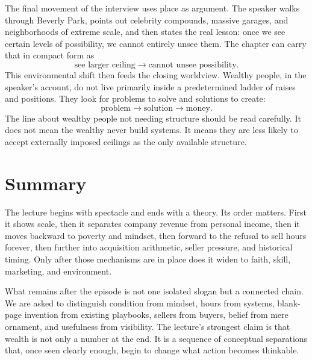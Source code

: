 The final movement of the interview uses place as argument. The speaker walks through Beverly Park, points out celebrity compounds, massive garages, and neighborhoods of extreme scale, and then states the real lesson: once we see certain levels of possibility, we cannot entirely unsee them. The chapter can carry that in compact form as
\begin{equation}
\text{see larger ceiling} \to \text{cannot unsee possibility}.
\end{equation}
This environmental shift then feeds the closing worldview. Wealthy people, in the speaker's account, do not live primarily inside a predetermined ladder of raises and positions. They look for problems to solve and solutions to create:
\begin{equation}
\text{problem} \to \text{solution} \to \text{money}.
\end{equation}
The line about wealthy people not needing structure should be read carefully. It does not mean the wealthy never build systems. It means they are less likely to accept externally imposed ceilings as the only available structure.

\section{Summary}

The lecture begins with spectacle and ends with a theory. Its order matters. First it shows scale, then it separates company revenue from personal income, then it moves backward to poverty and mindset, then forward to the refusal to sell hours forever, then further into acquisition arithmetic, seller pressure, and historical timing. Only after those mechanisms are in place does it widen to faith, skill, marketing, and environment.

What remains after the episode is not one isolated slogan but a connected chain. We are asked to distinguish condition from mindset, hours from systems, blank-page invention from existing playbooks, sellers from buyers, belief from mere ornament, and usefulness from visibility. The lecture's strongest claim is that wealth is not only a number at the end. It is a sequence of conceptual separations that, once seen clearly enough, begin to change what action becomes thinkable.
